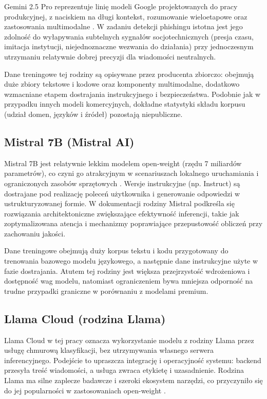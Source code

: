 \documentclass[12pt,a4paper,openright]{report}
\begin{document}
Gemini 2.5 Pro reprezentuje linię modeli Google projektowanych do pracy produkcyjnej, z naciskiem na długi kontekst, rozumowanie wieloetapowe oraz zastosowania multimodalne \cite{team2023gemini}. W zadaniu detekcji phishingu istotna jest jego zdolność do wyłapywania subtelnych sygnałów socjotechnicznych (presja czasu, imitacja instytucji, niejednoznaczne wezwania do działania) przy jednoczesnym utrzymaniu relatywnie dobrej precyzji dla wiadomości neutralnych.

Dane treningowe tej rodziny są opisywane przez producenta zbiorczo: obejmują duże zbiory tekstowe i kodowe oraz komponenty multimodalne, dodatkowo wzmacniane etapem dostrajania instrukcyjnego i bezpieczeństwa. Podobnie jak w przypadku innych modeli komercyjnych, dokładne statystyki składu korpusu (udział domen, języków i źródeł) pozostają niepubliczne.

\subsection{Mistral 7B (Mistral AI)}

Mistral 7B jest relatywnie lekkim modelem open-weight (rzędu 7 miliardów parametrów), co czyni go atrakcyjnym w scenariuszach lokalnego uruchamiania i ograniczonych zasobów sprzętowych \cite{jiang2023mistral7b}. Wersje instrukcyjne (np. Instruct) są dostrajane pod realizację poleceń użytkownika i generowanie odpowiedzi w ustrukturyzowanej formie. W dokumentacji rodziny Mistral podkreśla się rozwiązania architektoniczne zwiększające efektywność inferencji, takie jak zoptymalizowana atencja i mechanizmy poprawiające przepustowość obliczeń przy zachowaniu jakości.

Dane treningowe obejmują duży korpus tekstu i kodu przygotowany do trenowania bazowego modelu językowego, a następnie dane instrukcyjne użyte w fazie dostrajania. Atutem tej rodziny jest większa przejrzystość wdrożeniowa i dostępność wag modelu, natomiast ograniczeniem bywa mniejsza odporność na trudne przypadki graniczne w porównaniu z modelami premium.

\subsection{Llama Cloud (rodzina Llama)}

Llama Cloud w tej pracy oznacza wykorzystanie modelu z rodziny Llama przez usługę chmurową klasyfikacji, bez utrzymywania własnego serwera inferencyjnego. Podejście to upraszcza integrację i operacyjność systemu: backend przesyła treść wiadomości, a usługa zwraca etykietę i uzasadnienie. Rodzina Llama ma silne zaplecze badawcze i szeroki ekosystem narzędzi, co przyczyniło się do jej popularności w zastosowaniach open-weight \cite{touvron2023llama}.
\end{document}

